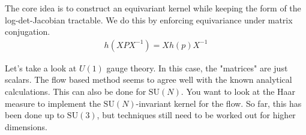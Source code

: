 \documentclass[book.tex]{subfiles}
\begin{document}
The core idea is to construct an equivariant kernel while keeping the form of the log-det-Jacobian tractable. We do this by enforcing equivariance under matrix conjugation.
\begin{align}
h(XPX^{-1}) = Xh(p)X^{-1}
\end{align}

Let's take a look at $U(1)$ gauge theory. In this case, the "matrices" are just scalars. The flow based method seems to agree well with the known analytical calculations. This can also be done for $\textrm{SU}(N)$. You want to look at the Haar measure to implement the $\textrm{SU}(N)$-invariant kernel for the flow. So far, this has been done up to $\textrm{SU}(3)$, but techniques still need to be worked out for higher dimensions. 
\end{document}

